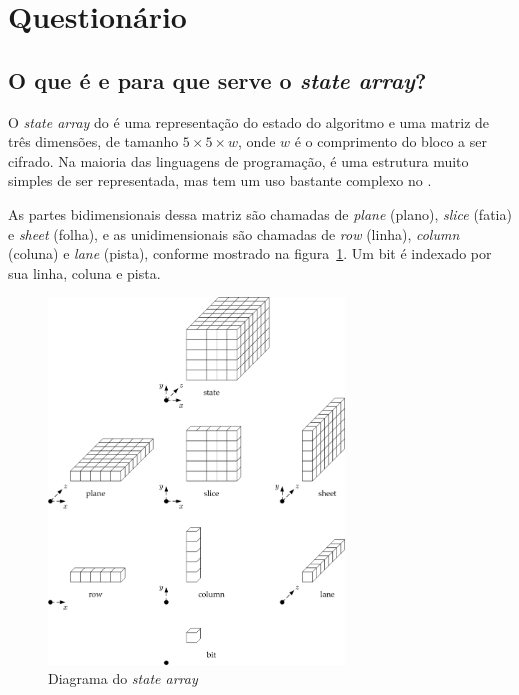 \section{Questionário}

\let\oldsubsection\thesubsection%
\renewcommand{\thesubsection}{\thesection.\alph{subsection}}

\subsection{O que é e para que serve o \textit{state array}?}

O \textit{state array} do \Keccak{} é uma representação do estado do algoritmo e
uma matriz de três dimensões, de tamanho $5 \times 5 \times w$, onde $w$ é o
comprimento do bloco a ser cifrado. Na maioria das linguagens de programação,
é uma estrutura muito simples de ser representada, mas tem um uso bastante
complexo no \Keccak.

As partes bidimensionais dessa matriz são chamadas de \textit{plane} (plano),
\textit{slice} (fatia) e \textit{sheet} (folha), e as unidimensionais são
chamadas de \textit{row} (linha), \textit{column} (coluna) e \textit{lane}
(pista), conforme mostrado na figura~\ref{fig:statearray}. Um bit é indexado
por sua linha, coluna e pista.

\begin{figure}[ht]
    \centering
    \includegraphics[width=0.7\textwidth]{images/statearray.png}
    \caption{Diagrama do \textit{state array}}
    \label{fig:statearray}
\end{figure}

